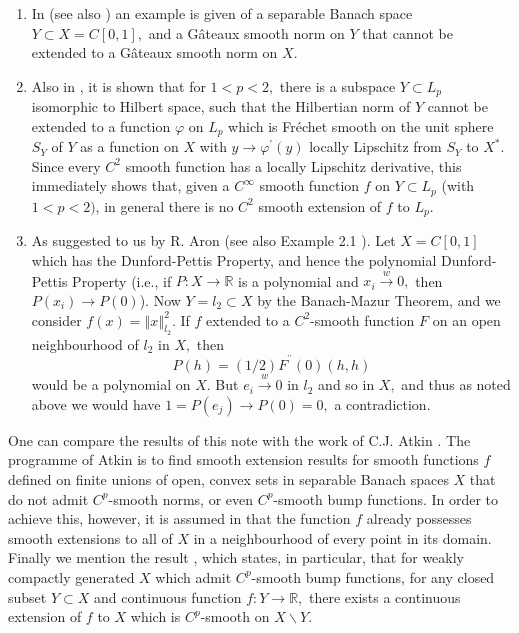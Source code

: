 \documentclass[11pt]{amsproc}%
\theoremstyle{plain}
\numberwithin{equation}{section}
\begin{document}
\medskip

\begin{enumerate}
\item In \cite{Z} (see also \cite[Theorem II.8.3, page 82]{DGZ}) an example is
given of a separable Banach space $Y\subset X=C\left[  0,1\right]  ,$ and a
G{{\^a}}teaux smooth norm on $Y$ that cannot be extended to a G{{\^a}}teaux
smooth norm on $X.$

\medskip

\item Also in \cite{Z}, it is shown that for $1<p<2,$ there is a subspace
$Y\subset L_{p}$ isomorphic to Hilbert space, such that the Hilbertian norm of
$Y$ cannot be extended to a function $\varphi$ on $L_{p}$ which is Fr{\'e}chet
smooth on the unit sphere $S_{Y}$ of $Y$ as a function on $X$ with
$y\rightarrow\varphi^{\prime}\left(  y\right)  $ locally Lipschitz from
$S_{Y}$ to $X^{\ast}.$ Since every $C^{2}$ smooth function has a locally
Lipschitz derivative, this immediately shows that, given a $C^{\infty}$ smooth
function $f$ on $Y\subset L_{p}$ (with $1<p<2)$, in general there is no
$C^{2}$ smooth extension of $f$ to $L_{p}$.

\medskip

\item As suggested to us by R. Aron \cite{A} (see also Example 2.1 \cite{AB}).
Let $X=C\left[  0,1\right]  $ which has the Dunford-Pettis Property, and hence
the polynomial Dunford-Pettis Property (i.e., if $P:X\rightarrow\mathbb{R}$ is
a polynomial and $x_{i}\overset{w}{\rightarrow}0,$ then $P\left(
x_{i}\right)  \rightarrow P\left(  0\right)  $). Now $Y=l_{2}\subset X$ by the
Banach-Mazur Theorem, and we consider $f\left(  x\right)  =\left\Vert
x\right\Vert _{l_{2}}^{2}.$ If $f$ extended to a $C^{2}$-smooth function $F$
on an open neighbourhood of $l_{2}$ in $X,$ then
\[
P\left(  h\right)  =\left(  1/2\right)  F^{^{\prime\prime}}\left(  0\right)
\left(  h,h\right)
\]
would be a polynomial on $X.$ But $e_{i}\overset{w}{\rightarrow}0$ in $l_{2}$
and so in $X,$ and thus as noted above we would have $1=P\left(  e_{j}\right)
\rightarrow P\left(  0\right)  =0,$ a contradiction.
\end{enumerate}

\smallskip

One can compare the results of this note with the work of C.J. Atkin
\cite{At}. The programme of Atkin is to find smooth extension results for
smooth functions $f$ defined on finite unions of open, convex sets in
separable Banach spaces $X$ that do not admit $C^{p}$-smooth norms, or even
$C^{p}$-smooth bump functions. In order to achieve this, however, it is
assumed in \cite{At} that the function $f$ already possesses smooth extensions
to all of $X$ in a neighbourhood of every point in its domain. Finally we
mention the result \cite[Proposition VIII.3.8]{DGZ}, which states, in
particular, that for weakly compactly generated $X$ which admit $C^{p}$-smooth
bump functions, for any closed subset $Y\subset X$ and continuous function
$f:Y\rightarrow\mathbb{R},$ there exists a continuous extension of $f$ to $X$
which is $C^{p}$-smooth on $X\backslash Y.$
\end{document}
